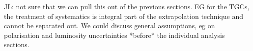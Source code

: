 {\color{red} JL: not sure that we can pull this out of the previous sections. EG for the TGCs, the treatment of systematics is integral part of the extrapolation technique and cannot be separated out. 
We could discuss general assumptions, eg on polarisation and luminosity uncertainties *before* the individual analysis sections.}

